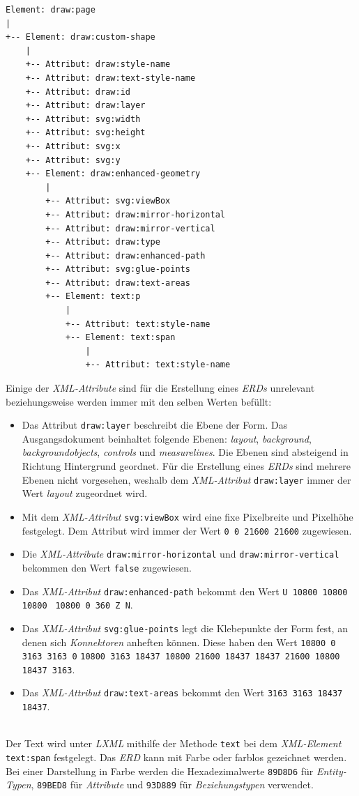 \begin{verbatim}
Element: draw:page
|
+-- Element: draw:custom-shape
    |
    +-- Attribut: draw:style-name
    +-- Attribut: draw:text-style-name
    +-- Attribut: draw:id
    +-- Attribut: draw:layer
    +-- Attribut: svg:width
    +-- Attribut: svg:height
    +-- Attribut: svg:x
    +-- Attribut: svg:y
    +-- Element: draw:enhanced-geometry
        |
        +-- Attribut: svg:viewBox
        +-- Attribut: draw:mirror-horizontal
        +-- Attribut: draw:mirror-vertical
        +-- Attribut: draw:type
        +-- Attribut: draw:enhanced-path
        +-- Attribut: svg:glue-points
        +-- Attribut: draw:text-areas
        +-- Element: text:p
            |
            +-- Attribut: text:style-name
            +-- Element: text:span
                |
                +-- Attribut: text:style-name

\end{verbatim}
\hon{}
\noindent
Einige der \textit{XML-Attribute} sind für die Erstellung eines \textit{ERDs} unrelevant beziehungsweise werden immer mit den selben Werten befüllt:
\begin{itemize}
	\item Das Attribut \verb|draw:layer| beschreibt die Ebene der Form. Das Ausgangsdokument beinhaltet folgende Ebenen: \textit{layout}, \textit{background}, \textit{backgroundobjects}, \textit{controls} und \textit{measurelines}. Die Ebenen sind absteigend in Richtung Hintergrund geordnet.
	Für die Erstellung eines \textit{ERDs} sind mehrere Ebenen nicht vorgesehen, weshalb dem \textit{XML-Attribut} \verb|draw:layer| immer der Wert \textit{layout} zugeordnet wird.
	\item Mit dem \textit{XML-Attribut} \verb|svg:viewBox| wird eine fixe Pixelbreite und Pixelhöhe festgelegt. Dem Attribut wird immer der Wert \verb|0 0 21600 21600| zugewiesen. 
	\item Die \textit{XML-Attribute} \verb|draw:mirror-horizontal| und \verb|draw:mirror-vertical| bekommen den Wert \verb|false| zugewiesen. 
	\item Das \textit{XML-Attribut} \verb|draw:enhanced-path| bekommt den Wert \verb|U 10800 10800 10800| \verb| 10800 0 360 Z N|.
	\item Das \textit{XML-Attribut} \verb|svg:glue-points| legt die Klebepunkte der Form fest, an denen sich \textit{Konnektoren} anheften können. Diese haben den Wert \verb|10800 0 3163 3163 0| \verb|10800 3163 18437 10800 21600 18437 18437 21600 10800 18437 3163|.
	\item Das \textit{XML-Attribut} \verb|draw:text-areas| bekommt den Wert \verb|3163 3163 18437 18437|.
\end{itemize}
\noindent
\hon{}
\\
\noindent
Der Text wird unter \textit{LXML} mithilfe der Methode \verb|text| bei dem \textit{XML-Element} \verb|text:span| festgelegt.
Das \textit{ERD} kann mit Farbe oder farblos gezeichnet werden. 
Bei einer Darstellung in Farbe werden die Hexadezimalwerte \verb|89D8D6| für \textit{Entity-Typen}, \verb|89BED8| für \textit{Attribute} und \verb|93D889| für \textit{Beziehungstypen} verwendet.
\\
\hon{}

